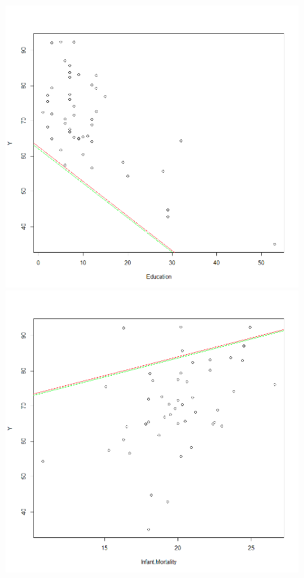 \documentclass[a4paper, twocolumn]{article}
\begin{document}
\begin{figure}[H]
\begin{minipage}[]{0.24\textwidth}
        \end{minipage}
        \begin{minipage}[]{0.24\textwidth}
        \includegraphics[width=\textwidth]{share/Lab2A1_lr_E.png}  
        \end{minipage}
        \begin{minipage}[]{0.24\textwidth}
        \includegraphics[width=\textwidth]{share/lab2A1_lr_IM.png}  
        \end{minipage}
        \end{figure}
\end{document}
